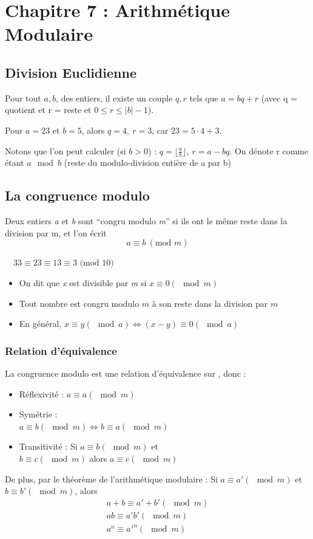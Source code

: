 \documentclass[11pt,a4paper]{article}
\begin{document}
\section[Arithmétique Modulaire]{Chapitre 7 : Arithmétique Modulaire}
\subsection{Division Euclidienne}
Pour tout $a,b$, des entiers, il existe un couple $q,r$ tels que $a = bq + r$ (avec q = quotient et r = reste et $0 \leq r \leq |b|-1$). 
\begin{exemple}[0.7]
	Pour $a = 23$ et $b = 5$, alors $q = 4,\ r = 3$, car $23 = 5\cdot 4 + 3$.
\end{exemple}  Notons que l'on peut calculer (si $b > 0$) : $q = \lfloor\frac{a}{b}\rfloor,\ r = a-bq$. On dénote r comme étant $a \mod b$ (reste du modulo-division entière de a par b)
\subsection{La congruence modulo}
Deux entiers \textit{a} et \textit{b} sont \enquote{congru modulo \textit{m}} si ils ont le même reste dans la division par m, et l'on écrit 
\begin{equation*}
	a\equiv b\ (\text{mod } m)
\end{equation*}
\begin{exemple}[0.45]
	 $\quad 33 \equiv 23 \equiv 13 \equiv 3 \text{ (mod } 10)$
\end{exemple}
\begin{itemize}
	\item On dit que \textit{x} est divisible par \textit{m} si $x \equiv 0 ( \mod m)$
	\item Tout nombre est congru modulo $m$ à son reste dans la division par $m$
	\item En général, $x\equiv y (\mod a) \iff (x-y) \equiv 0 (\mod a)$
\end{itemize}
\subsubsection{Relation d'équivalence}
La congruence modulo est une relation d'équivalence sur \Z, donc :
\begin{multicols}{2}
	\begin{itemize}
		\item 	Réflexivité : $a \equiv a (\mod m)$
		\item 	Symétrie :\\ $a \equiv b (\mod m) \iff b \equiv a (\mod m)$
		\item 	Transitivité : Si $a \equiv b (\mod m)$ et \\$b \equiv c ( \mod m)$ alors $a \equiv c (\mod m)$
	\end{itemize}
\end{multicols}
De plus, par le théorème de l'arithmétique modulaire :
Si $a \equiv a' (\mod m)$ et $b \equiv b' (\mod m)$, alors
\begin{align*}
	a+ b \equiv a' + b' (\mod m)\\
	ab \equiv a'b' (\mod m)\\
	a^n \equiv  a'^n (\mod m)
\end{align*}
\end{document}
